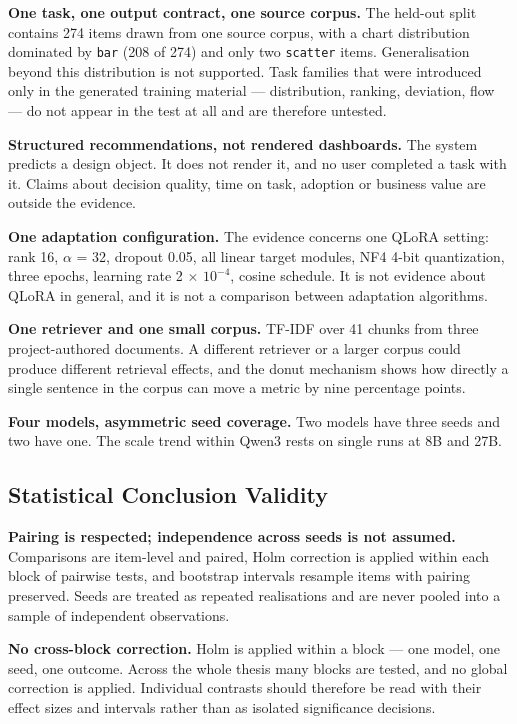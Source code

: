 \textbf{One task, one output contract, one source corpus.} The held-out split contains 274 items drawn from one source corpus, with a chart distribution dominated by \texttt{bar} (208 of 274) and only two \texttt{scatter} items. Generalisation beyond this distribution is not supported. Task families that were introduced only in the generated training material --- distribution, ranking, deviation, flow --- do not appear in the test at all and are therefore untested.

\textbf{Structured recommendations, not rendered dashboards.} The system predicts a design object. It does not render it, and no user completed a task with it. Claims about decision quality, time on task, adoption or business value are outside the evidence.

\textbf{One adaptation configuration.} The evidence concerns one QLoRA setting: rank 16, \(\alpha\) = 32, dropout 0.05, all linear target modules, NF4 4-bit quantization, three epochs, learning rate 2 \(\times\) \(10^{-4}\), cosine schedule. It is not evidence about QLoRA in general, and it is not a comparison between adaptation algorithms.

\textbf{One retriever and one small corpus.} TF-IDF over 41 chunks from three project-authored documents. A different retriever or a larger corpus could produce different retrieval effects, and the donut mechanism shows how directly a single sentence in the corpus can move a metric by nine percentage points.

\textbf{Four models, asymmetric seed coverage.} Two models have three seeds and two have one. The scale trend within Qwen3 rests on single runs at 8B and 27B.

\subsection{Statistical Conclusion Validity}

\textbf{Pairing is respected; independence across seeds is not assumed.} Comparisons are item-level and paired, Holm correction is applied within each block of pairwise tests, and bootstrap intervals resample items with pairing preserved. Seeds are treated as repeated realisations and are never pooled into a sample of independent observations.

\textbf{No cross-block correction.} Holm is applied within a block --- one model, one seed, one outcome. Across the whole thesis many blocks are tested, and no global correction is applied. Individual contrasts should therefore be read with their effect sizes and intervals rather than as isolated significance decisions.

